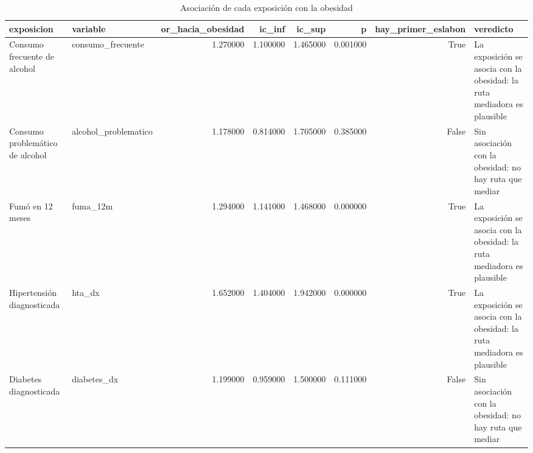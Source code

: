 \begin{table}[htbp]
\caption{Asociación de cada exposición con la obesidad}
\label{tab:tabla_42_primer_eslabon_mediacion}
\begin{tabular}{llrrrrrl}
\toprule
exposicion & variable & or\_hacia\_obesidad & ic\_inf & ic\_sup & p & hay\_primer\_eslabon & veredicto \\
\midrule
Consumo frecuente de alcohol & consumo\_frecuente & 1.270000 & 1.100000 & 1.465000 & 0.001000 & True & La exposición se asocia con la obesidad: la ruta mediadora es plausible \\
Consumo problemático de alcohol & alcohol\_problematico & 1.178000 & 0.814000 & 1.705000 & 0.385000 & False & Sin asociación con la obesidad: no hay ruta que mediar \\
Fumó en 12 meses & fuma\_12m & 1.294000 & 1.141000 & 1.468000 & 0.000000 & True & La exposición se asocia con la obesidad: la ruta mediadora es plausible \\
Hipertensión diagnosticada & hta\_dx & 1.652000 & 1.404000 & 1.942000 & 0.000000 & True & La exposición se asocia con la obesidad: la ruta mediadora es plausible \\
Diabetes diagnosticada & diabetes\_dx & 1.199000 & 0.959000 & 1.500000 & 0.111000 & False & Sin asociación con la obesidad: no hay ruta que mediar \\
\bottomrule
\end{tabular}
\end{table}
